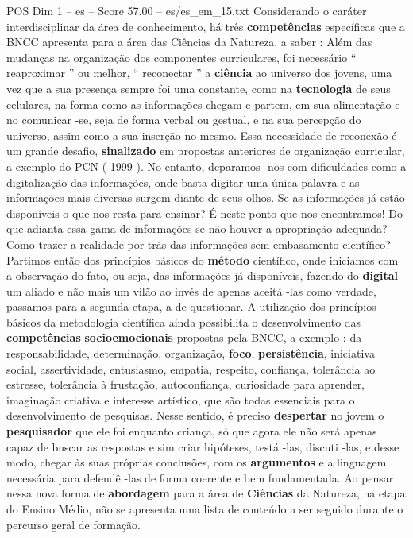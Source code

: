 \begin{textsample}{POS Dim 1 – es – Score 57.00 – es/es\_em\_15.txt}
Considerando o caráter interdisciplinar da área de conhecimento, há três \textbf{competências} específicas que a BNCC apresenta para a área das Ciências da Natureza, a saber : Além das mudanças na organização dos componentes curriculares, foi necessário “ reaproximar ” ou melhor, “ reconectar ” a \textbf{ciência} ao universo dos jovens, uma vez que a sua presença sempre foi uma constante, como na \textbf{tecnologia} de seus celulares, na forma como as informações chegam e partem, em sua alimentação e no comunicar -se, seja de forma verbal ou gestual, e na sua percepção do universo, assim como a sua inserção no mesmo.
Essa necessidade de reconexão é um grande desafio, \textbf{sinalizado} em propostas anteriores de organização curricular, a exemplo do PCN ( 1999 ).
No entanto, deparamos -nos com dificuldades como a digitalização das informações, onde basta digitar uma única palavra e as informações mais diversas surgem diante de seus olhos.
Se as informações já estão disponíveis o que nos resta para ensinar?
É neste ponto que nos encontramos!
Do que adianta essa gama de informações se não houver a apropriação adequada?
Como trazer a realidade por trás das informações sem embasamento científico?
Partimos então dos princípios básicos do \textbf{método} científico, onde iniciamos com a observação do fato, ou seja, das informações já disponíveis, fazendo do \textbf{digital} um aliado e não mais um vilão ao invés de apenas aceitá -las como verdade, passamos para a segunda etapa, a de questionar.
A utilização dos princípios básicos da metodologia científica ainda possibilita o desenvolvimento das \textbf{competências} \textbf{socioemocionais} propostas pela BNCC, a exemplo : da responsabilidade, determinação, organização, \textbf{foco}, \textbf{persistência}, iniciativa social, assertividade, entusiasmo, empatia, respeito, confiança, tolerância ao estresse, tolerância à frustação, autoconfiança, curiosidade para aprender, imaginação criativa e interesse artístico, que são todas essenciais para o desenvolvimento de pesquisas.
Nesse sentido, é preciso \textbf{despertar} no jovem o \textbf{pesquisador} que ele foi enquanto criança, só que agora ele não será apenas capaz de buscar as respostas e sim criar hipóteses, testá -las, discuti -las, e desse modo, chegar às suas próprias conclusões, com os \textbf{argumentos} e a linguagem necessária para defendê -las de forma coerente e bem fundamentada.
Ao pensar nessa nova forma de \textbf{abordagem} para a área de \textbf{Ciências} da Natureza, na etapa do Ensino Médio, não se apresenta uma lista de conteúdo a ser seguido durante o percurso geral de formação.

\end{textsample}
